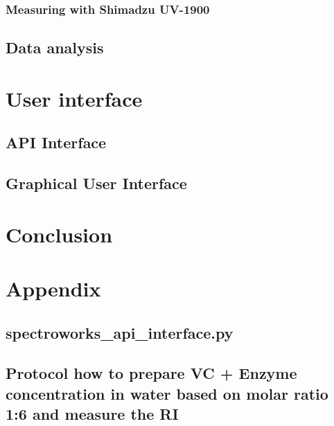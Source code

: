 \documentclass{article}
\begin{document}
\subsubsection{Measuring with Shimadzu UV-1900}
\subsection{Data analysis}

\newpage
\section{User interface}
\subsection{API Interface}
\subsection{Graphical User Interface}

\newpage
\section{Conclusion}

\newpage

\renewcommand*{\UrlFont}{\rmfamily}
\printbibliography

\section{Appendix}

\subsection{spectroworks\_api\_interface.py}

\subsection{Protocol how to prepare VC + Enzyme concentration in water based on molar ratio 1:6 and measure the RI}\label{appendix:protocol_vc}

\end{document}
